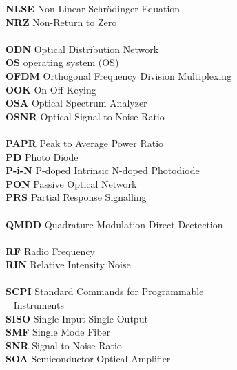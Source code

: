 \begin{multicols}{2}
\begin{tabbing}
\textbf{NLSE}		\>	Non-Linear Schr\"{o}dinger Equation				\\
\textbf{NRZ}		\>	Non-Return to Zero								\\
\\
\textbf{ODN}		\>	Optical Distribution Network					\\
\textbf{OS}         \>  operating system (OS)                           \\
\textbf{OFDM}		\>	Orthogonal Frequency Division Multiplexing		\\
\textbf{OOK}		\>	On Off Keying									\\
\textbf{OSA}		\>	Optical Spectrum Analyzer						\\
\textbf{OSNR}		\>	Optical Signal to Noise Ratio					\\
\\
\textbf{PAPR}		\>	Peak to Average Power Ratio						\\
\textbf{PD}			\>	Photo Diode										\\
\textbf{P-i-N}		\>	P-doped Intrinsic N-doped Photodiode			\\
\textbf{PON}		\>	Passive Optical Network							\\
\textbf{PRS}		\>	Partial Response Signalling						\\
\\
\textbf{QMDD}		\>	Quadrature Modulation Direct Dectection			\\
\\
\textbf{RF}			\>	Radio Frequency									\\
\textbf{RIN}		\>	Relative Intensity Noise						\\
\\
\textbf{SCPI}		\>	Standard Commands for Programmable					\\
~			\>	Instruments								\\
\textbf{SISO}		\>	Single Input Single Output						\\
\textbf{SMF}		\>	Single Mode Fiber								\\
\textbf{SNR}		\>	Signal to Noise Ratio							\\
\textbf{SOA}		\>	Semiconductor Optical Amplifier					\\

\end{tabbing}
\end{multicols}
